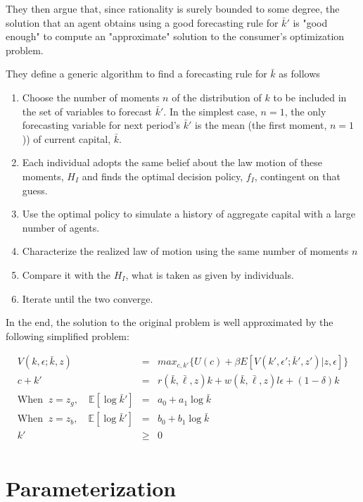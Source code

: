 \documentclass[titlepage]{\econtex}\providecommand{\texname}{KrusellSmithRep}%
\begin{document}
They then argue that, since rationality is surely bounded to some degree, the solution that an agent obtains using a good forecasting rule for $\bar{k}'$ is "good enough" to compute an "approximate" solution to the consumer's optimization problem.

They define a generic algorithm to find a forecasting rule for $\bar{k}$ as follows

\begin{enumerate}
	\item  Choose the number of moments $n$ of the distribution of $k$ to be included in the set of variables to forecast $\bar{k}'$. In the simplest case, $n=1$, the only forecasting variable for next period's $\bar{k}'$ is the mean (the first moment, $n=1$)) of current capital, $\bar{k}$.
	\item Each individual adopts the same belief about the law motion of these moments, $H_I$ and finds the optimal decision policy, $f_I$, contingent on that guess.
	\item Use the optimal policy to simulate a history of aggregate capital with a large number of agents. 
	\item Characterize the realized law of motion using the same number of moments $n$ 
	\item Compare it with the $H_I$, what is taken as given by individuals. 
	\item Iterate until the two converge. 
\end{enumerate}

In the end, the solution to the original problem is well approximated by the following simplified problem:

\begin{eqnarray*}
	V(k, \epsilon; \bar k, z) &=& max_{c, k'}\{U(c) + \beta E[V(k' ,\epsilon'; \bar k', z')|z, \epsilon]\} \\
	c + k' &=& r(\bar{k}, \bar{\ell}, z)k + w(\bar{k}, \bar{\ell}, z)l\epsilon + (1-\delta)k \\
	\text{When }~ z=z_g, \quad \mathbb{E}[\log\bar{k}'] & = & a_0 + a_1 \log\bar k \\
	\text{When }~ z=z_b,  \quad \mathbb{E}[\log\bar{k}'] & = & b_0 + b_1 \log\bar k \\
	k' &\geq& 0 \\
\end{eqnarray*}

\section{Parameterization}
\end{document}
